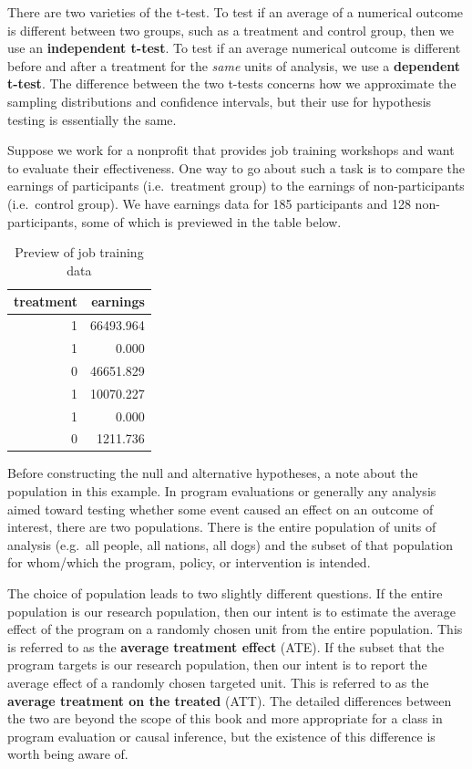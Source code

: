 \documentclass[
]{book}
\begin{document}
There are two varieties of the t-test. To test if an average of a numerical outcome is different between two groups, such as a treatment and control group, then we use an \textbf{independent t-test}. To test if an average numerical outcome is different before and after a treatment for the \emph{same} units of analysis, we use a \textbf{dependent t-test}. The difference between the two t-tests concerns how we approximate the sampling distributions and confidence intervals, but their use for hypothesis testing is essentially the same.

Suppose we work for a nonprofit that provides job training workshops and want to evaluate their effectiveness. One way to go about such a task is to compare the earnings of participants (i.e.~treatment group) to the earnings of non-participants (i.e.~control group). We have earnings data for 185 participants and 128 non-participants, some of which is previewed in the table below.

\begin{table}

\caption{\label{tab:jobtraindata}Preview of job training data}
\centering
\begin{tabular}[t]{r|r}
\hline
treatment & earnings\\
\hline
1 & 66493.964\\
\hline
1 & 0.000\\
\hline
0 & 46651.829\\
\hline
1 & 10070.227\\
\hline
1 & 0.000\\
\hline
0 & 1211.736\\
\hline
\end{tabular}
\end{table}

Before constructing the null and alternative hypotheses, a note about the population in this example. In program evaluations or generally any analysis aimed toward testing whether some event caused an effect on an outcome of interest, there are two populations. There is the entire population of units of analysis (e.g.~all people, all nations, all dogs) and the subset of that population for whom/which the program, policy, or intervention is intended.

The choice of population leads to two slightly different questions. If the entire population is our research population, then our intent is to estimate the average effect of the program on a randomly chosen unit from the entire population. This is referred to as the \textbf{average treatment effect} (ATE). If the subset that the program targets is our research population, then our intent is to report the average effect of a randomly chosen targeted unit. This is referred to as the \textbf{average treatment on the treated} (ATT). The detailed differences between the two are beyond the scope of this book and more appropriate for a class in program evaluation or causal inference, but the existence of this difference is worth being aware of.
\end{document}
